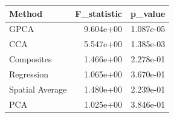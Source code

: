 \begin{tabular}{lrr}
\toprule
Method & F_statistic & p_value \\
\midrule
GPCA & 9.604e+00 & 1.087e-05 \\
CCA & 5.547e+00 & 1.385e-03 \\
Composites & 1.466e+00 & 2.278e-01 \\
Regression & 1.065e+00 & 3.670e-01 \\
Spatial Average & 1.480e+00 & 2.239e-01 \\
PCA & 1.025e+00 & 3.846e-01 \\
\bottomrule
\end{tabular}
